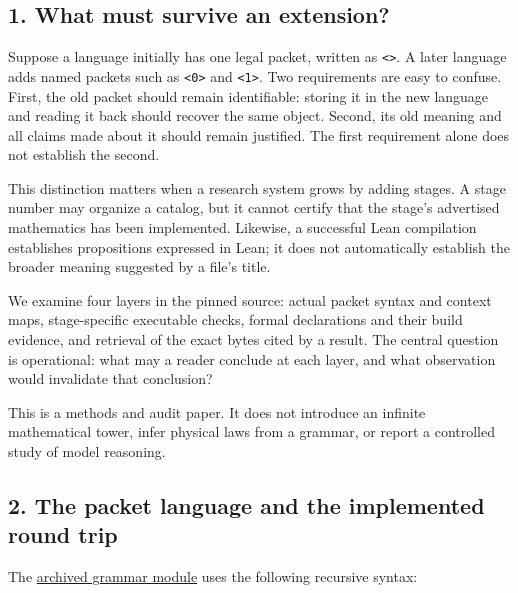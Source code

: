 \documentclass[
  11pt,
]{article}
\newcommand{\passthrough}[1]{#1}
\begin{document}
\hypertarget{what-must-survive-an-extension}{%
\subsection{1. What must survive an
extension?}\label{what-must-survive-an-extension}}

Suppose a language initially has one legal packet, written as
\passthrough{\lstinline!<>!}. A later language adds named packets such
as \passthrough{\lstinline!<0>!} and \passthrough{\lstinline!<1>!}. Two
requirements are easy to confuse. First, the old packet should remain
identifiable: storing it in the new language and reading it back should
recover the same object. Second, its old meaning and all claims made
about it should remain justified. The first requirement alone does not
establish the second.

This distinction matters when a research system grows by adding stages.
A stage number may organize a catalog, but it cannot certify that the
stage's advertised mathematics has been implemented. Likewise, a
successful Lean compilation establishes propositions expressed in Lean;
it does not automatically establish the broader meaning suggested by a
file's title.

We examine four layers in the pinned source: actual packet syntax and
context maps, stage-specific executable checks, formal declarations and
their build evidence, and retrieval of the exact bytes cited by a
result. The central question is operational: what may a reader conclude
at each layer, and what observation would invalidate that conclusion?

This is a methods and audit paper. It does not introduce an infinite
mathematical tower, infer physical laws from a grammar, or report a
controlled study of model reasoning.

\hypertarget{the-packet-language-and-the-implemented-round-trip}{%
\subsection{2. The packet language and the implemented round
trip}\label{the-packet-language-and-the-implemented-round-trip}}

The
\href{https://github.com/dbccpage/the_symbol_game/blob/main/education/documentation/030_pfp_proposal_fidelity_protocol_pfp/papers/symbol_game/008_pfp_mssn_tower_challenges_and_retraction_benchmarks/docs/source_archive/mss0_mss1_52cb5457/grammar.py}{archived
grammar module} uses the following recursive syntax:
\end{document}

